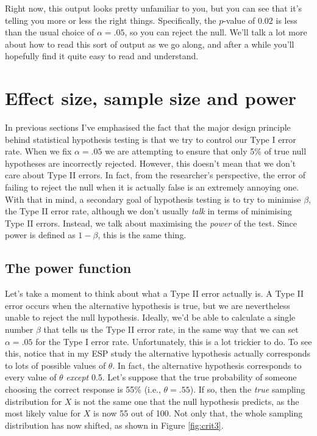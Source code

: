 \documentclass[
]{book}
\begin{document}
Right now, this output looks pretty unfamiliar to you, but you can see that it's telling you more or less the right things. Specifically, the \(p\)-value of 0.02 is less than the usual choice of \(\alpha = .05\), so you can reject the null. We'll talk a lot more about how to read this sort of output as we go along, and after a while you'll hopefully find it quite easy to read and understand.

\hypertarget{effectsize}{%
\section{Effect size, sample size and power}\label{effectsize}}

In previous sections I've emphasised the fact that the major design principle behind statistical hypothesis testing is that we try to control our Type I error rate. When we fix \(\alpha = .05\) we are attempting to ensure that only 5\% of true null hypotheses are incorrectly rejected. However, this doesn't mean that we don't care about Type II errors. In fact, from the researcher's perspective, the error of failing to reject the null when it is actually false is an extremely annoying one. With that in mind, a secondary goal of hypothesis testing is to try to minimise \(\beta\), the Type II error rate, although we don't usually \emph{talk} in terms of minimising Type II errors. Instead, we talk about maximising the \emph{power} of the test. Since power is defined as \(1-\beta\), this is the same thing.

\hypertarget{the-power-function}{%
\subsection{The power function}\label{the-power-function}}

Let's take a moment to think about what a Type II error actually is. A Type II error occurs when the alternative hypothesis is true, but we are nevertheless unable to reject the null hypothesis. Ideally, we'd be able to calculate a single number \(\beta\) that tells us the Type II error rate, in the same way that we can set \(\alpha = .05\) for the Type I error rate. Unfortunately, this is a lot trickier to do. To see this, notice that in my ESP study the alternative hypothesis actually corresponds to lots of possible values of \(\theta\). In fact, the alternative hypothesis corresponds to every value of \(\theta\) \emph{except} 0.5. Let's suppose that the true probability of someone choosing the correct response is 55\% (i.e., \(\theta = .55\)). If so, then the \emph{true} sampling distribution for \(X\) is not the same one that the null hypothesis predicts, as the most likely value for \(X\) is now 55 out of 100. Not only that, the whole sampling distribution has now shifted, as shown in Figure \ref{fig:crit3}.
\end{document}
